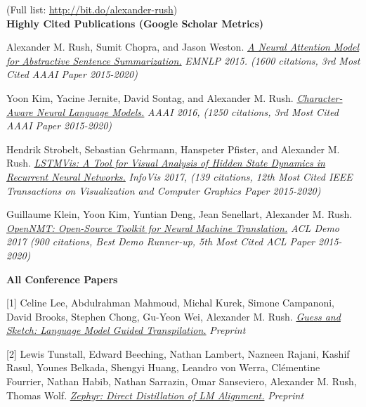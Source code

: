 \documentclass[10pt]{article}
\begin{document}
\bigskip



\noindent (Full list: \url{http://bit.do/alexander-rush}) \\

\medskip
\noindent
\textbf{Highly Cited Publications (Google Scholar Metrics)}

\ind Alexander M. Rush, Sumit Chopra, and Jason Weston. \emph{\href{ http://arxiv.org/pdf/1509.00685.pdf }{ A Neural Attention Model for Abstractive Sentence Summarization.} }\emph{ EMNLP 2015. (1600 citations, 3rd Most Cited AAAI Paper 2015-2020) }

\medskip


\ind Yoon Kim, Yacine Jernite, David Sontag, and Alexander M. Rush. \emph{\href{ https://arxiv.org/pdf/1508.06615v4 }{ Character-Aware Neural Language Models.} }\emph{ AAAI 2016, (1250 citations, 3rd Most Cited AAAI Paper 2015-2020) }

\medskip

\ind Hendrik Strobelt, Sebastian Gehrmann, Hanspeter Pfister, and Alexander M. Rush. \emph{\href{ http://lstm.seas.harvard.edu/ }{ LSTMVis: A Tool for Visual Analysis of Hidden State Dynamics in Recurrent Neural Networks.} }\emph{ InfoVis 2017, (139 citations, 12th Most Cited IEEE Transactions on Visualization and Computer Graphics Paper 2015-2020) }



\medskip
\ind Guillaume Klein, Yoon Kim, Yuntian Deng, Jean Senellart, Alexander M. Rush. \emph{\href{ https://arxiv.org/abs/1701.02810 }{ OpenNMT: Open-Source Toolkit for Neural Machine Translation.} }\emph{ ACL Demo 2017 (900 citations, Best Demo Runner-up, 5th Most Cited ACL Paper 2015-2020) }

\medskip

\noindent\textbf{All Conference Papers \vspace{0.01in}}


[1] \ind Celine Lee, Abdulrahman Mahmoud, Michal Kurek, Simone Campanoni, David Brooks, Stephen Chong, Gu-Yeon Wei, Alexander M. Rush. \emph{\href{ https://arxiv.org/pdf/2309.14396.pdf }{ Guess and Sketch: Language Model Guided Transpilation.} }\emph{ Preprint }

\medskip


[2] \ind Lewis Tunstall, Edward Beeching, Nathan Lambert, Nazneen Rajani, Kashif Rasul, Younes Belkada, Shengyi Huang, Leandro von Werra, Clémentine Fourrier, Nathan Habib, Nathan Sarrazin, Omar Sanseviero, Alexander M. Rush, Thomas Wolf. \emph{\href{ https://arxiv.org/pdf/2310.16944.pdf }{ Zephyr: Direct Distillation of LM Alignment.} }\emph{ Preprint }
\end{document}
